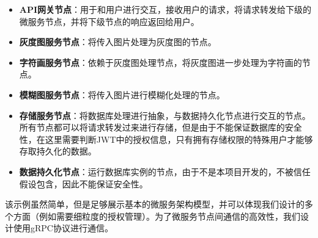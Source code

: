 \begin{itemize}
    \item \textbf{API网关节点}：用于和用户进行交互，接收用户的请求，将请求转发给下级的微服务节点，并将下级节点的响应返回给用户。
    \item \textbf{灰度图服务节点}：将传入图片处理为灰度图的节点。
    \item \textbf{字符画服务节点}：依赖于灰度图处理节点，将灰度图进一步处理为字符画的节点。
    \item \textbf{模糊图服务节点}：将传入图片进行模糊化处理的节点。
    \item \textbf{存储服务节点}：将数据库处理进行抽象，与数据持久化节点进行交互的节点。所有节点都可以将请求转发过来进行存储，但是由于不能保证数据库的安全性，在这里需要判断JWT中的授权信息，只有拥有存储权限的特殊用户才能够存取持久化的数据。
    \item \textbf{数据持久化节点}：运行数据库实例的节点，由于不是本项目开发的，不被信任假设包含，因此不能保证安全性。
\end{itemize}

该示例虽然简单，但是足够展示基本的微服务架构模型，并可以体现我们设计的多个方面（例如需要细粒度的授权管理）。为了微服务节点间通信的高效性，我们设计使用gRPC协议进行通信。
